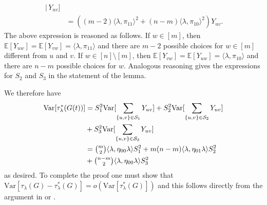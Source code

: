 \documentclass[10pt,journal,compsoc]{IEEEtran}
\theoremstyle{definition}
\begin{document}
\begin{IEEEproof}
\begin{equation}
\begin{split}
\, | \, Y_{uv}] \\
 &= ((m-2) \langle \lambda, \pi_{11} \rangle^{2} + (n-m)
    \langle \lambda, \pi_{10} \rangle^{2})Y_{uv}.
  \end{split}
\end{equation}
The above expression is reasoned as follows. If $w \in [m]$, then
$\mathbb{E}[Y_{uw}] = \mathbb{E}[Y_{vw}] = \langle \lambda,
\pi_{11} \rangle$ and there are $m-2$ possible choices for $w \in [m]$
different from $u$ and $v$. If $w \in [n] \setminus [m]$, then
$\mathbb{E}[Y_{vw}] = \mathbb{E}[Y_{uw}] = \langle \lambda, \pi_{10}
\rangle$ and there are $n - m$ possible choices for $w$. Analogous
reasoning gives the expressions for $S_2$ and $S_3$ in the statement
of the lemma. %

We therefore have
\begin{equation*}
  \begin{split}
  \mathrm{Var}[\tau_{\lambda}^{*}(G(t))] &= %
      S_1^{2} \mathrm{Var}[\sum_{\{u,v\} \in \mathcal{S}_1} Y_{uv}] +
      S_2^{2}
      \mathrm{Var}[\sum_{\{u,v\} \in \mathcal{S}_2} Y_{uv}] \\ &+
      S_3^{2}
      \mathrm{Var}[\sum_{\{u,v\} \in \mathcal{S}_3} Y_{uv}]  \\ &=
       \tbinom{m}{2} \langle \lambda, \eta_{00} \lambda \rangle S_1^{2} +
       m(n-m) \langle \lambda, \eta_{01} \lambda \rangle S_2^{2} \\ &+
       \tbinom{n-m}{2} \langle \lambda, \eta_{00} \lambda \rangle S_3^{2}
  \end{split}
\end{equation*}
as desired. To complete the proof one must show that
$\mathrm{Var}[\tau_{\lambda}(G) - \tau_{\lambda}^{*}(G)] =
o(\mathrm{Var}[\tau_{\lambda}^{*}(G)])$ and this follows directly from
the argument in \cite{nowicki88:_subgr_u_statis_method}
or \cite{rukhin09:_asymp_analy_various_statis_random_graph_infer}.
\end{IEEEproof}
\end{document}

